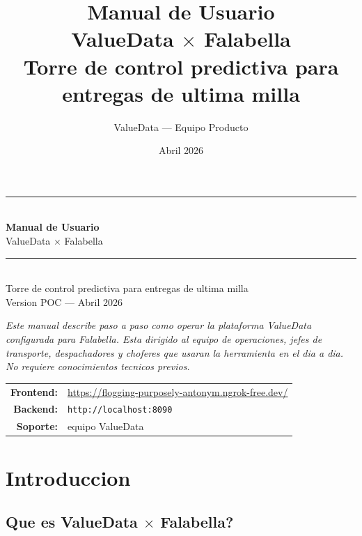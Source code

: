 \documentclass[11pt,a4paper]{article}
\title{%
  \vspace*{2cm}
  {\Huge\color{valuedataverde}\textbf{Manual de Usuario}}\\[0.6cm]
  {\LARGE ValueData $\times$ Falabella}\\[0.4cm]
  {\large Torre de control predictiva para entregas de ultima milla}
}
\author{ValueData --- Equipo Producto}
\date{Abril 2026}
\begin{document}
\begin{titlepage}
\centering
\vspace*{2.5cm}

{\color{valuedataverde}\rule{\linewidth}{1.2pt}}\\[0.4cm]
{\Huge\bfseries\color{valuedataverde} Manual de Usuario}\\[0.5cm]
{\LARGE ValueData $\times$ Falabella}\\[0.3cm]
{\color{valuedataverde}\rule{\linewidth}{0.6pt}}\\[0.6cm]

{\large Torre de control predictiva para entregas de ultima milla}\\[1.4cm]

{\large Version POC --- Abril 2026}\\[0.6cm]

\vspace{1cm}

\begin{minipage}{0.85\linewidth}\centering\itshape
Este manual describe paso a paso como operar la plataforma ValueData
configurada para Falabella. Esta dirigido al equipo de operaciones,
jefes de transporte, despachadores y choferes que usaran la herramienta
en el dia a dia. No requiere conocimientos tecnicos previos.
\end{minipage}

\vfill

\begin{tabular}{rl}
\textbf{Frontend:} & \url{https://flogging-purposely-antonym.ngrok-free.dev/} \\
\textbf{Backend:}  & \texttt{http://localhost:8090} \\
\textbf{Soporte:}  & equipo ValueData \\
\end{tabular}

\vspace{1cm}
\end{titlepage}

\tableofcontents
\newpage

\section{Introduccion}

\subsection{Que es ValueData $\times$ Falabella?}
\end{document}
